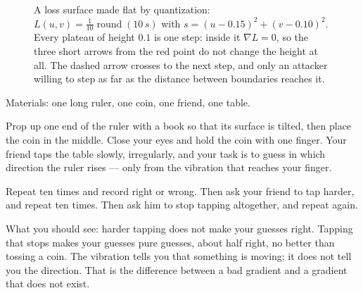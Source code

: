 \begin{figure}[!htbp]
\centering
{}
\caption{A loss surface made flat by quantization:
$L(u,v)=\frac{1}{10}\operatorname{round}(10\,s)$ with
$s=(u-0.15)^2+(v-0.10)^2$.
Every plateau of height $0.1$ is one step: inside it $\nabla L=0$,
so the three short arrows from the red point do not change the height at all.
The dashed arrow crosses to the next step, and only an attacker willing to step
as far as the distance between boundaries reaches it.}
\label{fig:permukaan}
\end{figure}

\begin{tangan}
Materials: one long ruler, one coin, one friend, one table.

Prop up one end of the ruler with a book so that its surface is tilted, then place the coin
in the middle. Close your eyes and hold the coin with one finger. Your friend taps the
table slowly, irregularly, and your task is to guess in which direction the ruler rises
--- only from the vibration that reaches your finger.

Repeat ten times and record right or wrong. Then ask your friend to tap harder,
and repeat ten times. Then ask him to stop tapping altogether, and repeat again.

What you should see: harder tapping does not make your guesses right. Tapping that stops
makes your guesses pure guesses, about half right, no better than tossing
a coin. The vibration tells you that something is moving; it does not tell you the direction.
That is the difference between a bad gradient and a gradient that does not exist.
\end{tangan}

